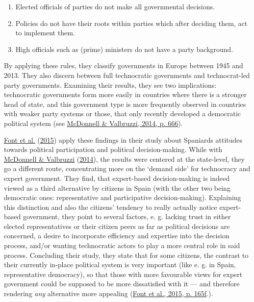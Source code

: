 \documentclass[
  12pt,
  english,
]{article}
\providecommand{\tightlist}{%
  \setlength{\itemsep}{0pt}\setlength{\parskip}{0pt}}
\begin{document}
\begin{enumerate}
\def\labelenumi{\arabic{enumi}.}
\tightlist
\item
  Elected officials of parties do not make all governmental decisions.
\item
  Policies do not have their roots within parties which after deciding
  them, act to implement them.
\item
  High officials such as (prime) ministers do not have a party
  background.
\end{enumerate}

By applying these rules, they classify governments in Europe between
1945 and 2013. They also discern between full technocratic governments
and technocrat-led party governments. Examining their results, they see
two implications: technocratic governments form more easily in countries
where there is a stronger head of state, and this government type is
more frequently observed in countries with weaker party systems or
those, that only recently developed a democratic political system (see
\protect\hyperlink{ref-mcdonnell2014defining}{McDonnell \& Valbruzzi,
2014, p. 666}).

\protect\hyperlink{ref-font2015participation}{Font et al.}
(\protect\hyperlink{ref-font2015participation}{2015}) apply these
findings in their study about Spaniards attitudes towards political
participation and political decision-making. While with
\protect\hyperlink{ref-mcdonnell2014defining}{McDonnell \& Valbruzzi}
(\protect\hyperlink{ref-mcdonnell2014defining}{2014}), the results were
centered at the state-level, they go a different route, concentrating
more on the `demand side' for technocracy and expert government. They
find, that expert-based decision-making is indeed viewed as a third
alternative by citizens in Spain (with the other two being democratic
ones: representative and participative decision-making). Explaining this
distinction and also the citizens' tendency to really actually notice
expert-based government, they point to several factors, e. g. lacking
trust in either elected representatives or their citizen peers as far as
political decisions are concerned, a desire to incorporate efficiency
and expertise into the decision process, and/or wanting technocratic
actors to play a more central role in said process. Concluding their
study, they state that for some citizens, the contrast to their
currently in-place political system is very important (like e. g. in
Spain, representative democracy), so that those with more favourable
views for expert government could be supposed to be more dissatisfied
with it --- and therefore rendering \emph{any} alternative more
appealing (\protect\hyperlink{ref-font2015participation}{Font et al.,
2015, p. 165f}.).
\end{document}
